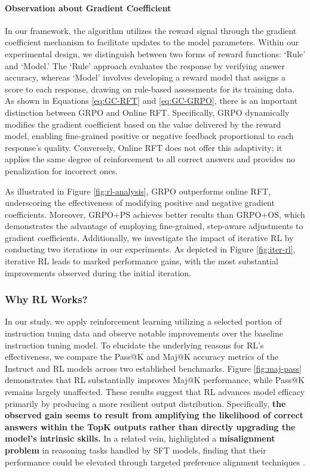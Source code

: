 \begin{itemize}[topsep=0pt]
\begin{itemize}[topsep=0pt]
\paragraph{Observation about Gradient Coefficient} In our framework, the algorithm utilizes the reward signal through the gradient coefficient mechanism to facilitate updates to the model parameters. Within our experimental design, we distinguish between two forms of reward functions: `Rule' and `Model.' The `Rule' approach evaluates the response by verifying answer accuracy, whereas `Model' involves developing a reward model that assigns a score to each response, drawing on rule-based assessments for its training data. As shown in Equations \ref{eq:GC-RFT} and \ref{eq:GC-GRPO}, there is an important distinction between GRPO and Online RFT. Specifically, GRPO dynamically modifies the gradient coefficient based on the value delivered by the reward model, enabling fine-grained positive or negative feedback proportional to each response's quality. Conversely, Online RFT does not offer this adaptivity; it applies the same degree of reinforcement to all correct answers and provides no penalization for incorrect ones.

As illustrated in Figure \ref{fig:rl-analysis}, GRPO outperforms online RFT, underscoring the effectiveness of modifying positive and negative gradient coefficients. Moreover, GRPO+PS achieves better results than GRPO+OS, which demonstrates the advantage of employing fine-grained, step-aware adjustments to gradient coefficients. Additionally, we investigate the impact of iterative RL by conducting two iterations in our experiments. As depicted in Figure \ref{fig:iter-rl}, iterative RL leads to marked performance gains, with the most substantial improvements observed during the initial iteration.

\subsubsection{Why RL Works?} In our study, we apply reinforcement learning utilizing a selected portion of instruction tuning data and observe notable improvements over the baseline instruction tuning model. To elucidate the underlying reasons for RL's effectiveness, we compare the Pass@K and Maj@K accuracy metrics of the Instruct and RL models across two established benchmarks. Figure \ref{fig:maj-pass} demonstrates that RL substantially improves Maj@K performance, while Pass@K remains largely unaffected. These results suggest that RL advances model efficacy primarily by producing a more resilient output distribution. Specifically, \textbf{the observed gain seems to result from amplifying the likelihood of correct answers within the TopK outputs rather than directly upgrading the model's intrinsic skills.} In a related vein, \citep{wang2023making} highlighted a \textbf{misalignment problem} in reasoning tasks handled by SFT models, finding that their performance could be elevated through targeted preference alignment techniques \citep{yuan2023rrhf,song2023preference,wang2023making}.


\end{itemize}
\end{itemize}
